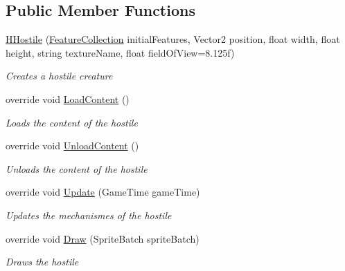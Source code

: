 \subsection*{Public Member Functions}
\begin{DoxyCompactItemize}
\item 
\hyperlink{class_hel_project_1_1_game_world_1_1_entities_1_1_h_hostile_a7b71c02b0f22735687ef5c68529837de}{H\+Hostile} (\hyperlink{class_hel_project_1_1_features_1_1_feature_collection}{Feature\+Collection} initial\+Features, Vector2 position, float width, float height, string texture\+Name, float field\+Of\+View=8.\+125f)
\begin{DoxyCompactList}\small\item\em Creates a hostile creature \end{DoxyCompactList}\item 
override void \hyperlink{class_hel_project_1_1_game_world_1_1_entities_1_1_h_hostile_ab244ce132ea02c1e4bf9e38f199dbe85}{Load\+Content} ()
\begin{DoxyCompactList}\small\item\em Loads the content of the hostile \end{DoxyCompactList}\item 
override void \hyperlink{class_hel_project_1_1_game_world_1_1_entities_1_1_h_hostile_a43c15c63adde7e4bb5747625a40789d7}{Unload\+Content} ()
\begin{DoxyCompactList}\small\item\em Unloads the content of the hostile \end{DoxyCompactList}\item 
override void \hyperlink{class_hel_project_1_1_game_world_1_1_entities_1_1_h_hostile_a3ce954aa41e47c306487d94ba64ae822}{Update} (Game\+Time game\+Time)
\begin{DoxyCompactList}\small\item\em Updates the mechanismes of the hostile \end{DoxyCompactList}\item 
override void \hyperlink{class_hel_project_1_1_game_world_1_1_entities_1_1_h_hostile_a548b6f33addf42cbe85d4058ace51d76}{Draw} (Sprite\+Batch sprite\+Batch)
\begin{DoxyCompactList}\small\item\em Draws the hostile \end{DoxyCompactList}\end{DoxyCompactItemize}
